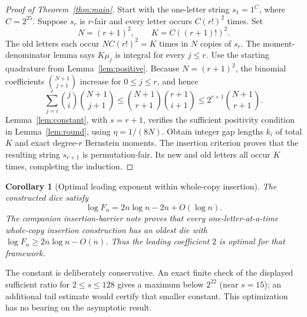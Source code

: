 \documentclass[11pt]{article}
\newtheorem{corollary}[theorem]{Corollary}
\begin{document}
\begin{proof}[Proof of Theorem~\ref{thm:main}]
Start with the one-letter string $s_1=1^C$, where $C=2^{25}$.
Suppose $s_r$ is $r$-fair and every letter occurs $C(r!)^2$ times.
Set
\[
 N=(r+1)^2,\qquad K=C((r+1)!)^2.
\]
The old letters each occur $NC(r!)^2=K$ times in $N$ copies of $s_r$.
The moment-denominator lemma says $K\mu_j$ is integral for every $j\le r$.
Use the starting quadrature from Lemma~\ref{lem:positive}.
Because $N=(r+1)^2$, the binomial coefficients
$\binom{N+1}{j+1}$ increase for $0\le j\le r$, and hence
\[
 \sum_{j=i}^r\binom ji\binom{N+1}{j+1}
 \le\binom{N+1}{r+1}\binom{r+1}{i+1}
 \le2^{r+1}\binom{N+1}{r+1}.
\]
Lemma~\ref{lem:constant}, with $s=r+1$, verifies the sufficient
positivity condition in Lemma~\ref{lem:round}, using $\eta=1/(8N)$.
Obtain integer gap lengths $k_i$ of total $K$ and exact degree-$r$
Bernstein moments. The insertion criterion proves that the resulting
string $s_{r+1}$ is permutation-fair. Its new and old letters all occur
$K$ times, completing the induction.
\end{proof}

\begin{corollary}[Optimal leading exponent within whole-copy insertion]
The constructed dice satisfy
\[
 \log F_n=2n\log n-2n+O(\log n).
\]
The companion insertion-barrier note proves that every one-letter-at-a-time
whole-copy insertion construction has an oldest die with
$\log F_n\ge2n\log n-O(n)$. Thus the leading coefficient $2$ is
optimal for that framework.
\end{corollary}

The constant is deliberately conservative. An exact finite check of the
displayed sufficient ratio for $2\le s\le128$ gives a maximum below
$2^{22}$ (near $s=15$); an additional tail estimate would certify that
smaller constant. This optimization has no bearing on the asymptotic result.
\end{document}

